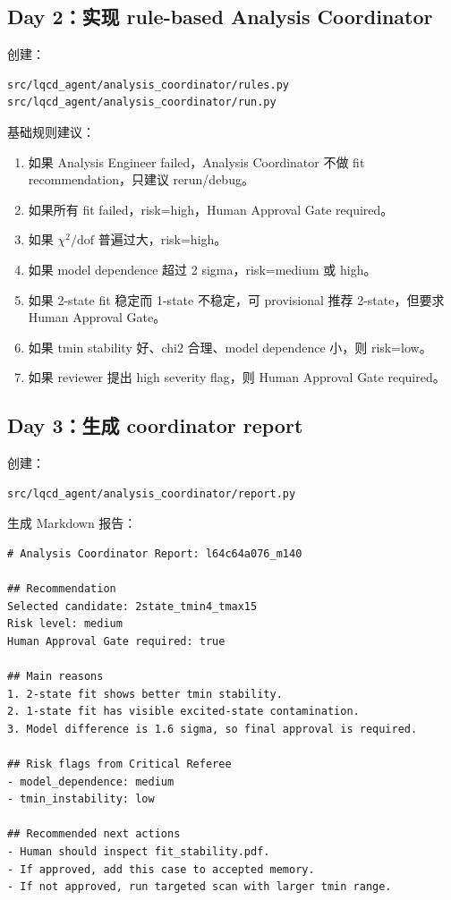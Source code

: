 \documentclass[11pt,a4paper,fontset=none]{ctexart}
\begin{document}
\subsection{Day 2：实现 rule-based Analysis Coordinator}

创建：

\begin{lstlisting}
src/lqcd_agent/analysis_coordinator/rules.py
src/lqcd_agent/analysis_coordinator/run.py
\end{lstlisting}

基础规则建议：

\begin{enumerate}[leftmargin=2em]
  \item 如果 Analysis Engineer failed，Analysis Coordinator 不做 fit recommendation，只建议 rerun/debug。
  \item 如果所有 fit failed，risk=high，Human Approval Gate required。
  \item 如果 \(\chi^2/\mathrm{dof}\) 普遍过大，risk=high。
  \item 如果 model dependence 超过 2 sigma，risk=medium 或 high。
  \item 如果 2-state fit 稳定而 1-state 不稳定，可 provisional 推荐 2-state，但要求 Human Approval Gate。
  \item 如果 tmin stability 好、chi2 合理、model dependence 小，则 risk=low。
  \item 如果 reviewer 提出 high severity flag，则 Human Approval Gate required。
\end{enumerate}

\subsection{Day 3：生成 coordinator report}

创建：

\begin{lstlisting}
src/lqcd_agent/analysis_coordinator/report.py
\end{lstlisting}

生成 Markdown 报告：

\begin{lstlisting}
# Analysis Coordinator Report: l64c64a076_m140

## Recommendation
Selected candidate: 2state_tmin4_tmax15
Risk level: medium
Human Approval Gate required: true

## Main reasons
1. 2-state fit shows better tmin stability.
2. 1-state fit has visible excited-state contamination.
3. Model difference is 1.6 sigma, so final approval is required.

## Risk flags from Critical Referee
- model_dependence: medium
- tmin_instability: low

## Recommended next actions
- Human should inspect fit_stability.pdf.
- If approved, add this case to accepted memory.
- If not approved, run targeted scan with larger tmin range.
\end{lstlisting}
\end{document}
